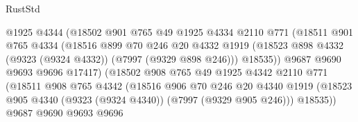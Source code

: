 \begin{lexlean}{RustStd}
\begin{coremodule}
                                @1925
                                @4344
                                (@18502
                                  @901
                                  @765
                                  @49
                                  @1925
                                  @4334
                                  @2110
                                  @771
                                  (@18511
                                    @901
                                    @765
                                    @4334
                                    (@18516
                                      @899
                                      @70
                                      @246
                                      @20
                                      @4332
                                      @1919
                                      (@18523
                                        @898
                                        @4332
                                        (@9323 (@9324 @4332))
                                        (@7997 (@9329 @898 @246)))
                                      @18535))
                                  @9687
                                  @9690
                                  @9693
                                  @9696
                                  @17417)
                                (@18502
                                  @908
                                  @765
                                  @49
                                  @1925
                                  @4342
                                  @2110
                                  @771
                                  (@18511
                                    @908
                                    @765
                                    @4342
                                    (@18516
                                      @906
                                      @70
                                      @246
                                      @20
                                      @4340
                                      @1919
                                      (@18523
                                        @905
                                        @4340
                                        (@9323 (@9324 @4340))
                                        (@7997 (@9329 @905 @246)))
                                      @18535))
                                  @9687
                                  @9690
                                  @9693
                                  @9696

\end{coremodule}
\end{lexlean}
